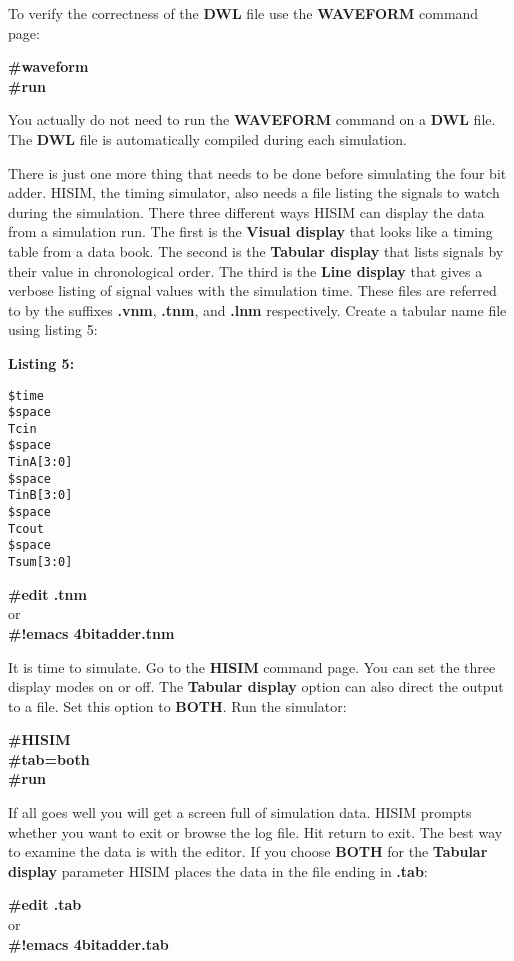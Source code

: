   To verify the correctness of the {\bf DWL} file use the {\bf WAVEFORM} command
page:

{\bf   \#waveform}\\
{\bf   \#run}

  You actually do not need to run the {\bf WAVEFORM} command on a {\bf DWL}
file.  The {\bf DWL} file is automatically compiled during each simulation.

  There is just one more thing that needs to be done before
simulating the four bit adder.  HISIM, the timing simulator, also needs
a file listing the signals to watch during the simulation.
There three different ways HISIM can display the data from a
simulation run.  The first is the {\bf Visual display} that looks like
a timing table from a data book.  The second is the {\bf Tabular display}
that lists signals by their value in chronological order.  The
third is the {\bf Line display} that gives a verbose listing of signal
values with the simulation time.  These files are referred to by
the suffixes {\bf .vnm}, {\bf .tnm}, and {\bf .lnm} respectively.  Create a
tabular name file using listing 5:

{\bf Listing 5:}

\begin{verbatim}
$time
$space
Tcin
$space
TinA[3:0]
$space
TinB[3:0]
$space
Tcout
$space
Tsum[3:0]
\end{verbatim}

{\bf   \#edit .tnm}\\
    or\\
{\bf   \#!emacs 4bitadder.tnm}

  It is time to simulate.  Go to the {\bf HISIM} command page.  You can
set the three display modes on or off.  The {\bf Tabular display} option
can also direct the output to a file.  Set this option to {\bf BOTH}. 
Run the simulator:

{\bf   \#HISIM}\\
{\bf   \#tab=both}\\
{\bf   \#run}

  If all goes well you will get a screen full of simulation data.
HISIM prompts whether you want to exit or browse the log file.
Hit return to exit.  The best way to examine the data is with 
the editor.  If you choose {\bf BOTH} for the {\bf Tabular display}
parameter HISIM places the data in the file ending in {\bf .tab}:

{\bf   \#edit .tab}\\
    or\\
{\bf   \#!emacs 4bitadder.tab}

